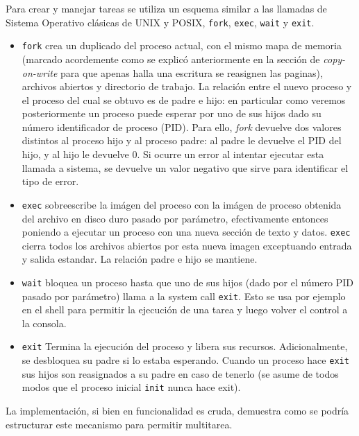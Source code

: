 Para crear y manejar tareas se utiliza un esquema similar a las llamadas de Sistema Operativo cl\'asicas de UNIX y POSIX, \texttt{fork},
\texttt{exec}, \texttt{wait} y \texttt{exit}.

\begin{itemize}
	\item \texttt{fork} crea un duplicado del proceso actual, con el mismo mapa de memoria (marcado acordemente como se explic\'o anteriormente
	en la secci\'on de \textit{copy-on-write} para que apenas halla una escritura se reasignen las paginas), 
	archivos abiertos y directorio de trabajo.
	La relaci\'on entre el nuevo proceso y el proceso del cual se obtuvo es de padre e hijo: en particular como veremos posteriormente
	un proceso puede esperar por uno de sus hijos dado su n\'umero identificador de proceso (PID). Para ello, \textit{fork} devuelve dos
	valores distintos al proceso hijo y al proceso padre: al padre le devuelve el PID del hijo, y al hijo le devuelve 0. Si ocurre un error
	al intentar ejecutar esta llamada a sistema, se devuelve un valor negativo que sirve para identificar el tipo de error. 	
	\item \texttt{exec} sobreescribe la im\'agen del proceso con la im\'agen de proceso obtenida del archivo en disco duro pasado por
	par\'ametro, efectivamente entonces poniendo a ejecutar un proceso con una nueva secci\'on de texto y datos. \texttt{exec} cierra
	todos los archivos abiertos por esta nueva imagen exceptuando entrada y salida estandar. La relaci\'on padre e hijo se mantiene.
	\item \texttt{wait} bloquea un proceso hasta que uno de sus hijos (dado por el n\'umero PID pasado por par\'ametro) llama a la
	system call \texttt{exit}. Esto se usa por ejemplo en el shell para permitir la ejecuci\'on de una tarea y luego volver el control
	a la consola.
	\item \texttt{exit} Termina la ejecuci\'on del proceso y libera sus recursos. Adicionalmente, se desbloquea su padre si lo estaba
	esperando. Cuando un proceso hace \texttt{exit} sus hijos son reasignados a su padre en caso de tenerlo (se asume de todos modos que
	el proceso inicial \texttt{init} nunca hace exit).
\end{itemize}

La implementaci\'on, si bien en funcionalidad es cruda, demuestra como se podr\'ia estructurar este mecanismo para permitir multitarea.

